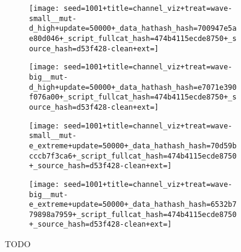 \begin{figure}[!htbp]
\begin{center}
\begin{subfigure}[b]{0.45\columnwidth}
  \texttt{[image: seed=1001+title=channel\_viz+treat=wave-small\_\_mut-d\_high+update=50000+\_data\_hathash\_hash=700947e5ae80d046+\_script\_fullcat\_hash=474b4115ecde8750+\_source\_hash=d53f428-clean+ext=]}
\end{subfigure}
\begin{subfigure}[b]{0.45\columnwidth}
  \texttt{[image: seed=1001+title=channel\_viz+treat=wave-big\_\_mut-d\_high+update=50000+\_data\_hathash\_hash=e7071e390f076a00+\_script\_fullcat\_hash=474b4115ecde8750+\_source\_hash=d53f428-clean+ext=]}
\end{subfigure}

\begin{subfigure}[b]{0.45\columnwidth}
  \texttt{[image: seed=1001+title=channel\_viz+treat=wave-small\_\_mut-e\_extreme+update=50000+\_data\_hathash\_hash=70d59bcccb7f3ca6+\_script\_fullcat\_hash=474b4115ecde8750+\_source\_hash=d53f428-clean+ext=]}
\end{subfigure}
\begin{subfigure}[b]{0.45\columnwidth}
  \texttt{[image: seed=1001+title=channel\_viz+treat=wave-big\_\_mut-e\_extreme+update=50000+\_data\_hathash\_hash=6532b779898a7959+\_script\_fullcat\_hash=474b4115ecde8750+\_source\_hash=d53f428-clean+ext=]}
\end{subfigure}
\caption{
TODO
}
\label{fig:grid_progression}
\end{center}
\end{figure}
